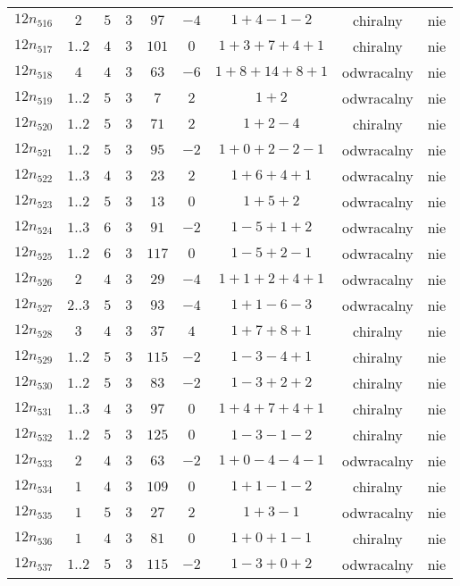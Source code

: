 \begin{longtable}{ccccccccc}
$12n_{516}$ & $2$ & $5$ & $3$ & $97$ & $-4$ & $1+4-1-2$ & chiralny & nie \\
$12n_{517}$ & $1..2$ & $4$ & $3$ & $101$ & $0$ & $1+3+7+4+1$ & chiralny & nie \\
$12n_{518}$ & $4$ & $4$ & $3$ & $63$ & $-6$ & $1+8+14+8+1$ & odwracalny & nie \\
$12n_{519}$ & $1..2$ & $5$ & $3$ & $7$ & $2$ & $1+2$ & odwracalny & nie \\
$12n_{520}$ & $1..2$ & $5$ & $3$ & $71$ & $2$ & $1+2-4$ & chiralny & nie \\
$12n_{521}$ & $1..2$ & $5$ & $3$ & $95$ & $-2$ & $1+0+2-2-1$ & odwracalny & nie \\
$12n_{522}$ & $1..3$ & $4$ & $3$ & $23$ & $2$ & $1+6+4+1$ & odwracalny & nie \\
$12n_{523}$ & $1..2$ & $5$ & $3$ & $13$ & $0$ & $1+5+2$ & odwracalny & nie \\
$12n_{524}$ & $1..3$ & $6$ & $3$ & $91$ & $-2$ & $1-5+1+2$ & odwracalny & nie \\
$12n_{525}$ & $1..2$ & $6$ & $3$ & $117$ & $0$ & $1-5+2-1$ & odwracalny & nie \\
$12n_{526}$ & $2$ & $4$ & $3$ & $29$ & $-4$ & $1+1+2+4+1$ & odwracalny & nie \\
$12n_{527}$ & $2..3$ & $5$ & $3$ & $93$ & $-4$ & $1+1-6-3$ & odwracalny & nie \\
$12n_{528}$ & $3$ & $4$ & $3$ & $37$ & $4$ & $1+7+8+1$ & chiralny & nie \\
$12n_{529}$ & $1..2$ & $5$ & $3$ & $115$ & $-2$ & $1-3-4+1$ & chiralny & nie \\
$12n_{530}$ & $1..2$ & $5$ & $3$ & $83$ & $-2$ & $1-3+2+2$ & chiralny & nie \\
$12n_{531}$ & $1..3$ & $4$ & $3$ & $97$ & $0$ & $1+4+7+4+1$ & chiralny & nie \\
$12n_{532}$ & $1..2$ & $5$ & $3$ & $125$ & $0$ & $1-3-1-2$ & chiralny & nie \\
$12n_{533}$ & $2$ & $4$ & $3$ & $63$ & $-2$ & $1+0-4-4-1$ & odwracalny & nie \\
$12n_{534}$ & $1$ & $4$ & $3$ & $109$ & $0$ & $1+1-1-2$ & chiralny & nie \\
$12n_{535}$ & $1$ & $5$ & $3$ & $27$ & $2$ & $1+3-1$ & odwracalny & nie \\
$12n_{536}$ & $1$ & $4$ & $3$ & $81$ & $0$ & $1+0+1-1$ & chiralny & nie \\
$12n_{537}$ & $1..2$ & $5$ & $3$ & $115$ & $-2$ & $1-3+0+2$ & odwracalny & nie \\

\end{longtable}
